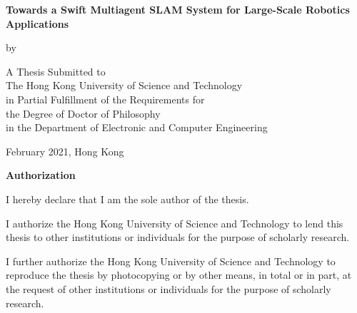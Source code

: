 

\null\vspace{0.5in}
\begin{center}
{\Large\bf Towards a Swift Multiagent SLAM System for Large-Scale Robotics Applications}
\vspace{2.5cm}

{\large by}
\vspace{0.5cm}

{\large\bf \thesisWriter{}}\normalsize
\vspace{2.5cm}

A Thesis Submitted to \\
The Hong Kong University of Science and Technology \\
in Partial Fulfillment of the Requirements for \\
the Degree of Doctor of Philosophy \\
in the Department of Electronic and Computer Engineering
\vspace{1.5cm}

February 2021, Hong Kong
\end{center}

\newpage

\begin{center}{\Large\bf Authorization}\normalsize
\end{center}
\vspace{0.5cm}

I hereby declare that I am the sole author of the thesis.

\vspace{0.5cm}

I authorize the Hong Kong University of Science and Technology to lend this thesis
to other institutions or individuals for the purpose of scholarly research.

\vspace{0.5cm}

I further authorize the Hong Kong University of Science and Technology to
reproduce the thesis by photocopying or by other means, in total or in
part, at the request of other institutions or individuals for the
purpose of scholarly research.

\vspace{0.3cm}

